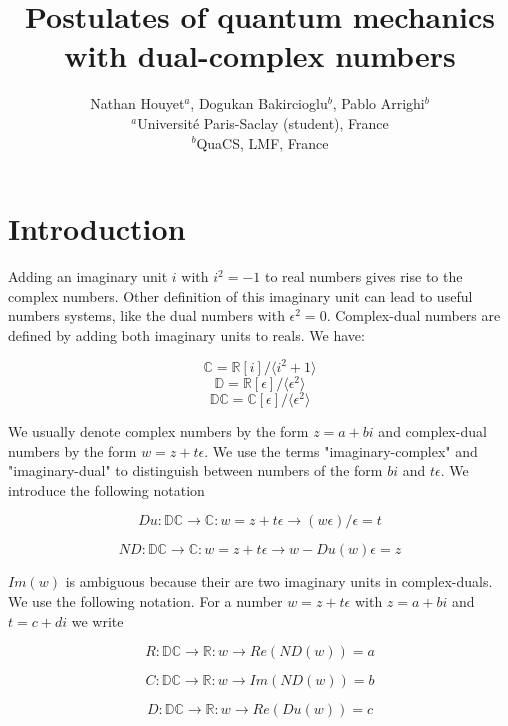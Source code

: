 \documentclass{article}
\title{Postulates of quantum mechanics with dual-complex numbers}
\author{Nathan Houyet$^{a}$, Dogukan Bakircioglu$^{b}$, Pablo Arrighi$^{b}$ \\
        \small $^{a}$Université Paris-Saclay (student), France \\
        \small $^{b}$QuaCS, LMF, France \\
}
\date{}
\newcommand{\R}{\mathbb{R}}
\newcommand{\C}{\mathbb{C}}
\newcommand{\D}{\mathbb{D}}
\newcommand{\DC}{\mathbb{DC}}
\newcommand{\e}{\epsilon}
\begin{document}
\maketitle

\section{Introduction}
\noindent Adding an imaginary unit $i$ with $i^2 = -1$ to real numbers gives rise to the complex numbers. Other definition of this imaginary unit can lead to useful numbers systems, like the dual numbers with $\e^2 = 0$. Complex-dual numbers are defined by adding both imaginary units to reals. We have:

\begin{equation}
\C = \R [i]/\langle i^2+1 \rangle
\end{equation}
\begin{equation}
\D = \R [\e]/\langle \e^2 \rangle
\end{equation}
\begin{equation}
\DC = \C [\e]/\langle \e^2 \rangle
\end{equation}

We usually denote complex numbers by the form $z = a + bi$ and complex-dual numbers by the form $w = z + t\e$. We use the terms "imaginary-complex" and "imaginary-dual" to distinguish between numbers of the form $bi$ and $t\e$. We introduce the following notation

\begin{equation}
Du: \DC \to \C: w = z + t\e \to (w \e)/\e = t
\end{equation}

\begin{equation}
ND: \DC \to \C: w = z + t\e \to w - Du(w) \e = z
\end{equation}

$Im(w)$ is ambiguous because their are two imaginary units in complex-duals. We use the following notation. For a number $w = z + t\e$ with $z = a + bi$ and $t = c + di$ we write

\begin{equation}
R: \DC \to \R: w \to Re(ND(w)) = a
\end{equation}

\begin{equation}
C: \DC \to \R: w \to Im(ND(w)) = b
\end{equation}

\begin{equation}
D: \DC \to \R: w \to Re(Du(w)) = c
\end{equation}
\end{document}
